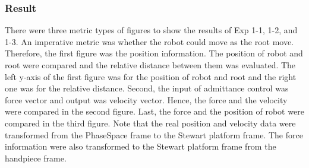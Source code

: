 \subsubsection{Result}
\hspace*{6mm} There were three metric types of figures to show the results of Exp 1-1, 1-2, and 1-3. An imperative metric was whether the robot could move as the root move. Therefore, the first figure was the position information. The position of robot and root were compared and the relative distance between them was evaluated. The left y-axis of the first figure was for the position of robot and root and the right one was for the relative distance. Second, the input of admittance control was force vector and output was velocity vector. Hence, the force and the velocity were compared in the second figure. Last, the force and the position of robot were compared in the third figure. Note that the real position and velocity data were transformed from the PhaseSpace frame to the Stewart platform frame. The force information were also transformed to the Stewart platform frame from the handpiece frame.

